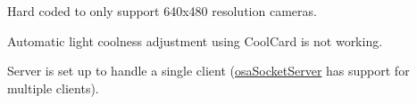
\begin{DoxyRefList}
\item[\label{bug__bug000001}%
\hypertarget{bug__bug000001}{}%
File \hyperlink{mts_micron_tracker_8h}{mts\-Micron\-Tracker.h} ]Hard coded to only support 640x480 resolution cameras. 

Automatic light coolness adjustment using Cool\-Card is not working. 
\item[\label{bug__bug000002}%
\hypertarget{bug__bug000002}{}%
File \hyperlink{mts_open_i_g_t_link_8h}{mts\-Open\-I\-G\-T\-Link.h} ]Server is set up to handle a single client (\hyperlink{classosa_socket_server}{osa\-Socket\-Server} has support for multiple clients).
\end{DoxyRefList}